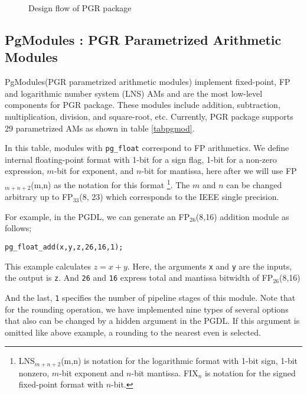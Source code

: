 \documentclass{article}
\begin{document}
\begin{figure}[t]
\begin{minipage}[b]{1.0\linewidth}\centering
  \centerline{}
\end{minipage}
\caption{Design flow of PGR package}\label{PGRFLOW}
\end{figure}





\subsection{PgModules : PGR Parametrized Arithmetic Modules}

PgModules(PGR parametrized arithmetic modules) implement fixed-point, 
FP and logarithmic number system (LNS) AMs and 
are the most low-level components for PGR package.
These modules include addition, subtraction, multiplication, division, and square-root, etc. 
Currently, PGR package supports
29 parametrized AMs as shown in table \ref{tabpgmod}.


In this table, modules with {\tt pg\_float} correspond to FP arithmetics. 
We define internal floating-point format with 1-bit
for a sign flag, 1-bit for a non-zero expression, $m$-bit for
exponent, and $n$-bit for mantissa, here after we  will use FP$_{m+n+2}$(m,n) as the notation for this format
\footnote{LNS$_{m+n+2}$(m,n) is notation for the logarithmic format
 with 1-bit sign, 1-bit nonzero, $m$-bit exponent and $n$-bit
 mantissa.  FIX$_{n}$ is notation for the signed fixed-point format
 with $n$-bit.}.  The $m$ and $n$ can be changed arbitrary up to
 FP$_{33}$(8, 23) which corresponds to the IEEE single precision.

For example, in the PGDL, we can generate an FP$_{26}$(8,16) addition module
as follows;
\begin{verbatim}
pg_float_add(x,y,z,26,16,1);
\end{verbatim}
This example calculates $z = x + y$. 
Here, the arguments \verb|x| and \verb|y| are the inputs, the output is \verb|z|.
And \verb|26| and \verb|16| express total and mantissa bitwidth of FP$_{26}$(8,16)


And the last, \verb|1| specifies the number of pipeline stages of this module.
Note that for the rounding operation, we have implemented nine types
of several options that also can be changed by a hidden argument in the PGDL.
If this argument is omitted like above example, a rounding to the nearest even is selected.
\end{document}
